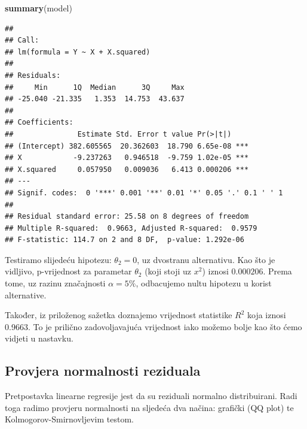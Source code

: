 \documentclass[]{article}
\newenvironment{Shaded}{\begin{snugshade}}{\end{snugshade}}
\newcommand{\KeywordTok}[1]{\textcolor[rgb]{0.13,0.29,0.53}{\textbf{{#1}}}}
\newcommand{\DataTypeTok}[1]{\textcolor[rgb]{0.13,0.29,0.53}{{#1}}}
\newcommand{\DecValTok}[1]{\textcolor[rgb]{0.00,0.00,0.81}{{#1}}}
\newcommand{\StringTok}[1]{\textcolor[rgb]{0.31,0.60,0.02}{{#1}}}
\newcommand{\NormalTok}[1]{{#1}}
\begin{document}
\begin{Shaded}
\begin{Highlighting}[]
\KeywordTok{summary}\NormalTok{(model)}
\end{Highlighting}
\end{Shaded}

\begin{verbatim}
## 
## Call:
## lm(formula = Y ~ X + X.squared)
## 
## Residuals:
##     Min      1Q  Median      3Q     Max 
## -25.040 -21.335   1.353  14.753  43.637 
## 
## Coefficients:
##               Estimate Std. Error t value Pr(>|t|)    
## (Intercept) 382.605565  20.362603  18.790 6.65e-08 ***
## X            -9.237263   0.946518  -9.759 1.02e-05 ***
## X.squared     0.057950   0.009036   6.413 0.000206 ***
## ---
## Signif. codes:  0 '***' 0.001 '**' 0.01 '*' 0.05 '.' 0.1 ' ' 1
## 
## Residual standard error: 25.58 on 8 degrees of freedom
## Multiple R-squared:  0.9663, Adjusted R-squared:  0.9579 
## F-statistic: 114.7 on 2 and 8 DF,  p-value: 1.292e-06
\end{verbatim}

Testiramo slijedeću hipotezu: \(\theta_2 = 0\), uz dvostranu
alternativu. Kao što je vidljivo, p-vrijednost za parametar \(\theta_2\)
(koji stoji uz \(x^ 2\)) iznosi \(0.000206\). Prema tome, uz razinu
značajnosti \(\alpha = 5\%\), odbacujemo nultu hipotezu u korist
alternative.

Također, iz priloženog sažetka doznajemo vrijednost statistike \(R^2\)
koja iznosi 0.9663. To je prilično zadovoljavajuća vrijednost iako
možemo bolje kao što ćemo vidjeti u nastavku.

\subsection{Provjera normalnosti
reziduala}\label{provjera-normalnosti-reziduala}

Pretpostavka linearne regresije jest da su reziduali normalno
distribuirani. Radi toga radimo provjeru normalnosti na sljedeća dva
načina: grafički (QQ plot) te Kolmogorov-Smirnovljevim testom.

\begin{Shaded}
\end{Shaded}
\end{document}
